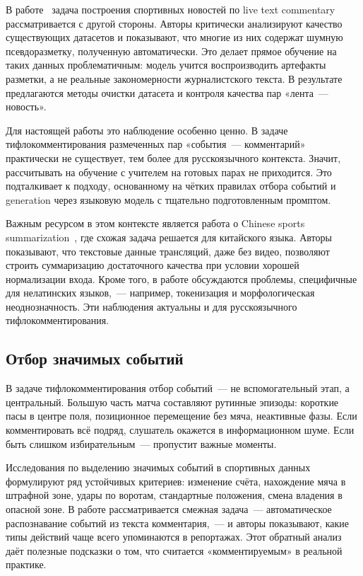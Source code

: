 \documentclass[a4paper,14pt]{extarticle}
\numberwithin{table}{section}
\numberwithin{figure}{section}
\numberwithin{equation}{section}
\begin{document}
В работе~\cite{sportssum2} задача построения спортивных новостей по live text commentary рассматривается с другой стороны. Авторы критически анализируют качество существующих датасетов и показывают, что многие из них содержат шумную псевдоразметку, полученную автоматически. Это делает прямое обучение на таких данных проблематичным: модель учится воспроизводить артефакты разметки, а не реальные закономерности журналистского текста. В результате предлагаются методы очистки датасета и контроля качества пар «лента~--- новость».

Для настоящей работы это наблюдение особенно ценно. В задаче тифлокомментирования размеченных пар «события~--- комментарий» практически не существует, тем более для русскоязычного контекста. Значит, рассчитывать на обучение с учителем на готовых парах не приходится. Это подталкивает к подходу, основанному на чётких правилах отбора событий и generation через языковую модель с тщательно подготовленным промптом.

Важным ресурсом в этом контексте является работа о Chinese sports summarization~\cite{chinesesports}, где схожая задача решается для китайского языка. Авторы показывают, что текстовые данные трансляций, даже без видео, позволяют строить суммаризацию достаточного качества при условии хорошей нормализации входа. Кроме того, в работе обсуждаются проблемы, специфичные для нелатинских языков,~--- например, токенизация и морфологическая неоднозначность. Эти наблюдения актуальны и для русскоязычного тифлокомментирования.

\subsection{Отбор значимых событий}

В задаче тифлокомментирования отбор событий~--- не вспомогательный этап, а центральный. Большую часть матча составляют рутинные эпизоды: короткие пасы в центре поля, позиционное перемещение без мяча, неактивные фазы. Если комментировать всё подряд, слушатель окажется в информационном шуме. Если быть слишком избирательным~--- пропустит важные моменты.

Исследования по выделению значимых событий в спортивных данных~\cite{contentselection,zhang2016sportsnews} формулируют ряд устойчивых критериев: изменение счёта, нахождение мяча в штрафной зоне, удары по воротам, стандартные положения, смена владения в опасной зоне. В работе рассматривается смежная задача~--- автоматическое распознавание событий из текста комментария,~--- и авторы показывают, какие типы действий чаще всего упоминаются в репортажах. Этот обратный анализ даёт полезные подсказки о том, что считается «комментируемым» в реальной практике.
\end{document}
